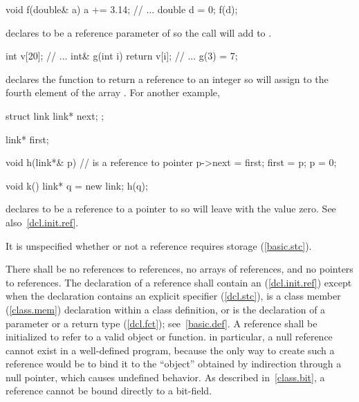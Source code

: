 \pnum
{}%
%
\enterexample

\begin{codeblock}
void f(double& a) { a += 3.14; }
// ...
double d = 0;
f(d);
\end{codeblock}

declares
to be a reference parameter of
so the call
will add
to
.

\begin{codeblock}
int v[20];
// ...
int& g(int i) { return v[i]; }
// ...
g(3) = 7;
\end{codeblock}

declares the function
to return a reference to an integer so
will assign
to the fourth element of the array
.
For another example,

\begin{codeblock}
struct link {
  link* next;
};

link* first;

void h(link*& p) {  //  is a reference to pointer
  p->next = first;
  first = p;
  p = 0;
}

void k() {
   link* q = new link;
   h(q);
}
\end{codeblock}

declares
to be a reference to a pointer to
so
will leave
with the value zero.
See also~\ref{dcl.init.ref}.
\exitexample

\pnum
It is unspecified whether or not
a reference requires storage (\ref{basic.stc}).

\pnum
{}%
There shall be no references to references,
no arrays of references, and no pointers to references.
%
The declaration of a reference shall contain an
(\ref{dcl.init.ref})
except when the declaration contains an explicit
specifier (\ref{dcl.stc}),
is a class member (\ref{class.mem}) declaration within a class definition,
or is the declaration of a parameter or a return type (\ref{dcl.fct}); see~\ref{basic.def}.
A reference shall be initialized to refer to a valid object or function.
\enternote
{}%
in particular, a null reference cannot exist in a well-defined program,
because the only way to create such a reference would be to bind it to
the ``object'' obtained by indirection through a null pointer,
which causes undefined behavior.
As described in~\ref{class.bit}, a reference cannot be bound directly
to a bit-field.
\exitnote

